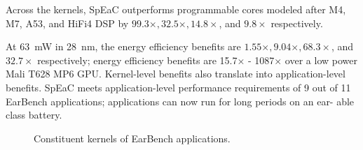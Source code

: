 Across the kernels, SpEaC outperforms programmable cores modeled after M4, M7,
A53, and HiFi4 DSP by \(99.3\times, 32.5\times, 14.8\times\), and \(9.8\times\)
respectively.

At \SI{63}{\milli\watt} in \SI{28}{\nano\meter}, the energy efficiency benefits
are \(1.55\times, 9.04\times, 68.3\times\), and \(32.7\times\) respectively;
energy efficiency benefits are 15.7× - 1087× over a low power Mali T628 MP6
GPU. Kernel-level benefits also translate into application-level benefits.
SpEaC meets application-level performance requirements of 9 out of 11 EarBench
applications; applications can now run for long periods on an ear- able class
battery.


\begin{figure}
  \centering
  
  \caption{\small Constituent kernels of EarBench applications.}
  \label{fig:kernels_breakdown}
\end{figure}



